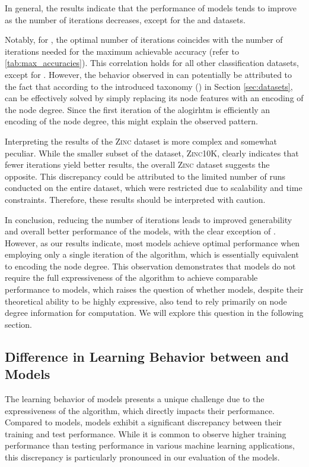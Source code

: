 In general, the results indicate that the performance of \wlnn models tends to improve as the number of \wl iterations decreases, except for the \nci and \zinc datasets. 

Notably, for \nci, the optimal number of iterations coincides with the number of \wl iterations needed for the maximum achievable accuracy (refer to \cref{tab:max_accuracies}). This correlation holds for all other classification datasets, except for \mutag. However, the behavior observed in \mutag can potentially be attributed to the fact that according to the introduced taxonomy (\cite{Liu2022}) in Section \ref{sec:datasets}, \mutag can be effectively solved by simply replacing its node features with an encoding of the node degree. Since the first iteration of the \wl alogirhtm is efficiently an encoding of the node degree, this might explain the observed pattern.

Interpreting the results of the \textsc{Zinc} dataset is more complex and somewhat peculiar. While the smaller subset of the dataset, \textsc{Zinc10K}, clearly indicates that fewer \wl iterations yield better results, the overall \textsc{Zinc} dataset suggests the opposite. This discrepancy could be attributed to the limited number of runs conducted on the entire dataset, which were restricted due to scalability and time constraints. Therefore, these results should be interpreted with caution.

In conclusion, reducing the number of \wl iterations leads to improved generability and overall better performance of the models, with the clear exception of \nci. However, as our results indicate, most \wlnn models achieve optimal performance when employing only a single iteration of the \wl algorithm, which is essentially equivalent to encoding the node degree. This observation demonstrates that \wlnn models do not require the full expressiveness of the \wl algorithm to achieve comparable performance to \gnn models, which raises the question of whether \gnn models, despite their theoretical ability to be highly expressive, also tend to rely primarily on node degree information for computation. We will explore this question in the following section.

\subsection{Difference in Learning Behavior between \gnn and \wlnn Models}
The learning behavior of \wlnn models presents a unique challenge due to the expressiveness of the \wl algorithm, which directly impacts their performance. Compared to \gnn models, \wlnn models exhibit a significant discrepancy between their training and test performance. While it is common to observe higher training performance than testing performance in various machine learning applications, this discrepancy is particularly pronounced in our evaluation of the \wlnn models.

